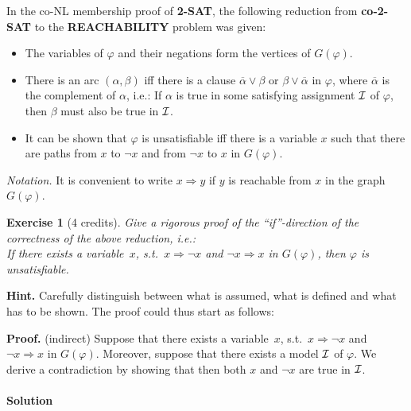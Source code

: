 \documentclass [11pt]{article}
\newcommand{\Ra}{\Rightarrow}
\newcommand{\compl}[1]{\overline{#1}}
\renewcommand{\phi}{\varphi}
\newtheorem{exercise}[theorem]{Exercise}
\begin{document}



\medskip


\noindent
In the co-NL membership proof of {\bf 2-SAT}, the following reduction from {\bf co-2-SAT}
to the {\bf REACHABILITY} problem was given:

\begin{itemize}
\item The variables of $\phi$ and their negations form the vertices of
$G(\phi)$.
\item
There is an arc $(\alpha,\beta)$ iff there is a clause $\compl{\alpha}
\lor \beta$ or $\beta \lor \compl{\alpha}$ in $\phi$, 
where $\compl{\alpha}$ is the complement of $\alpha$, i.e.: If $\alpha$ is true
in some satisfying assignment ${\cal I}$ of $\phi$, then $\beta$ must also be true in ${\cal I}$.
\item It can be shown that $\phi$ is unsatisfiable iff there is a variable $x$ such that
there are paths from $x$ to $\neg x$ and from $\neg x$ to $x$ in
$G(\phi)$.
\end{itemize}

\noindent
{\em Notation.}
It is convenient to write $x \Ra y$ if $y$ is reachable from $x$ in 
the graph $G(\phi)$.

\begin{exercise}[4 credits]
{\em Give a rigorous proof of the 
``if''-direction of the correctness of the above reduction, i.e.: \\
%
If there exists a variable~$x$, s.t.\
$x \Ra  \neg x$ and $\neg x \Ra x$ in
$G(\phi)$, then $\phi$ is unsatisfiable.
}%
\end{exercise}


\noindent
{\bf Hint.} Carefully distinguish between what is assumed, what is defined and what has to be shown. The proof could thus start as follows: 

\medskip
\noindent
{\bf Proof.} (indirect) 
Suppose that there exists a variable~$x$, s.t.\
$x \Ra  \neg x$ and $\neg x \Ra x$ in
$G(\phi)$. Moreover, suppose that there exists a model ${\cal I}$ of $\phi$. We derive a contradiction by showing that 
then both $x$ and $\neg x$ are true in ${\cal I}$. 


\paragraph*{Solution}
\end{document}

